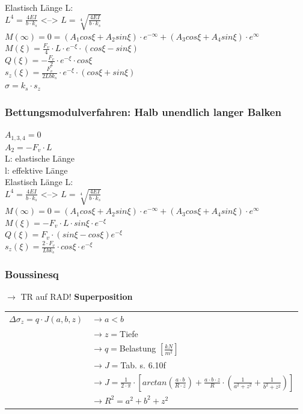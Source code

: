 \begin{multicols}{2}
	Elastisch Länge L:\\
	$L^4 = \frac{4EI}{b\cdot k_s}$
	<-->
	$L = \sqrt[4]{\frac{4EI}{b\cdot k_s}}$\\
	$M(\infty)=0=(A_1cos\xi + A_2sin\xi)\cdot e^{-\infty}+(A_3cos\xi + A_4sin\xi) \cdot e^\infty$\\
	$M(\xi)=\frac{F_v}{4}\cdot L\cdot e^{-\xi}\cdot(cos\xi - sin\xi)$\\
	$Q(\xi)=-\frac{F_v}{2}\cdot e^{-\xi}\cdot cos\xi$\\
	$s_z(\xi)=\frac{F_v}{2Lbk_s}\cdot e^{-\xi}\cdot(cos\xi+sin\xi)$ \\
	$ \sigma = k_s \cdot s_z $
	\subsubsection{Bettungsmodulverfahren: Halb unendlich langer Balken}
	$A_{1,3,4} = 0$ \\
	$A_2=-F_v\cdot L$\\
	L: elastische Länge\\
	l: effektive Länge\\
	
	Elastisch Länge L:\\
	$L^4 = \frac{4EI}{b\cdot k_s}$
	<-->
	$L = \sqrt[4]{\frac{4EI}{b\cdot k_s}}$\\
	$M(\infty)=0=(A_1cos\xi + A_2sin\xi)\cdot e^{-\infty}+(A_3cos\xi + A_4sin\xi) \cdot e^\infty$\\
	$M(\xi)=-F_v\cdot L\cdot sin\xi\cdot e^{-\xi} $\\
	$Q(\xi)=F_v\cdot (sin\xi - cos\xi) e^{-\xi}$\\
	$s_z(\xi)=\frac{2\cdot F_v}{Lbk_s}\cdot cos\xi\cdot e^{-\xi}$


	\subsubsection{Boussinesq}
	
	\begin{minipage}[t]{0.5\linewidth}
		$\rightarrow$ TR auf RAD!
		\textbf{Superposition}
		\begin{tabular}{ll}
			$\Delta \sigma_z=q \cdot J(a,b,z)$	& $\rightarrow a<b$ \\
			& $\rightarrow z=$Tiefe \\
			& $\rightarrow q=$Belastung $\left[\frac{kN}{m^2}\right]$ \\
			& $\rightarrow J=$Tab. s. 6.10f \\
			& $\rightarrow J=\frac{1}{2\cdot \pi} \cdot \left[arctan(\frac{a \cdot b}{R \cdot z}) + \frac{a \cdot b \cdot z}{R} \cdot  \left(\frac{1}{a^2 + z^2} + \frac{1}{b^2 + z^2}\right) \right]$ \\
			& $\rightarrow R^2=a^2 + b^2 + z^2$ \\	
		\end{tabular}
		

\end{minipage}
\end{multicols}
